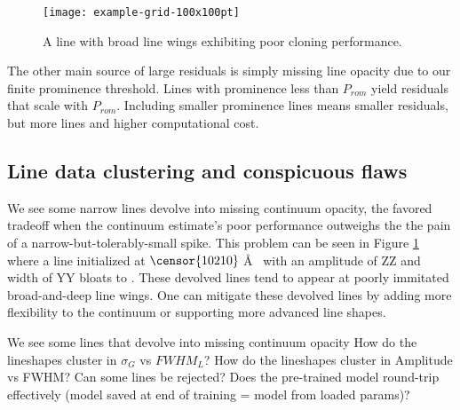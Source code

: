 \documentclass[modern]{aastex631}
\begin{document}
\begin{figure}[hbt!]
  \centering
  \texttt{[image: example-grid-100x100pt]}
  \caption{A  line with broad line wings exhibiting poor cloning performance.}
  \label{fig_poor_cloning_performance}
\end{figure}

The other main source of large residuals is simply missing line opacity due to our finite prominence threshold.  Lines with prominence less than $P_{rom}$ yield residuals that scale with $P_{rom}$.  Including smaller prominence lines means smaller residuals, but more lines and higher computational cost.


\subsection{Line data clustering and conspicuous flaws}
We see some narrow lines devolve into missing continuum opacity, the favored tradeoff when the continuum estimate's poor performance outweighs the the pain of a narrow-but-tolerably-small spike.  This problem can be seen in Figure \ref{fig_poor_cloning_performance} where a line initialized at $\censor{10210}\;$\AA~ with an amplitude of ZZ and width of YY bloats to .  These devolved lines tend to appear at poorly immitated broad-and-deep line wings.  One can mitigate these devolved lines by adding more flexibility to the continuum or supporting more advanced line shapes.


\begin{outline}
  \1 We see some lines that devolve into missing continuum opacity
  \1 How do the lineshapes cluster in $\sigma_G$ vs $FWHM_L$?
  \1 How do the lineshapes cluster in Amplitude vs FWHM? Can some lines be rejected?
  \1 Does the pre-trained model round-trip effectively (model saved at end of training = model from loaded params)?
\end{outline}
\end{document}
